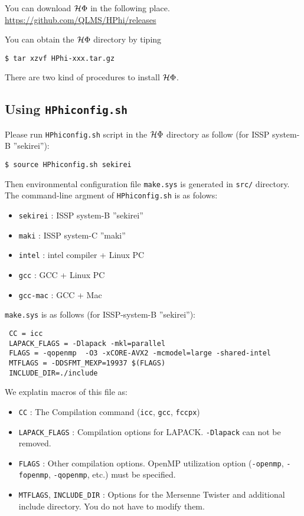 You can download $\mathcal{H} \Phi$ in the following place.\\
\url{https://github.com/QLMS/HPhi/releases}

You can obtain the $\mathcal{H} \Phi$ directory by tiping
\begin{verbatim}
$ tar xzvf HPhi-xxx.tar.gz
\end{verbatim}

There are two kind of procedures to install $\mathcal{H} \Phi$.

\subsection{Using \texttt{HPhiconfig.sh}}

Please run \verb|HPhiconfig.sh| script in the $\mathcal{H} \Phi$ directory as follow
(for ISSP system-B ''sekirei''):
\begin{verbatim}
$ source HPhiconfig.sh sekirei
\end{verbatim}
Then environmental configuration file \verb|make.sys| is generated in 
\verb|src/| directory.
The command-line argment of \verb|HPhiconfig.sh| is as folows:
\begin{itemize}
\item \verb|sekirei| : ISSP system-B ''sekirei''
\item \verb|maki| : ISSP system-C ''maki''
\item \verb|intel| : intel compiler + Linux PC
\item \verb|gcc| : GCC + Linux PC
\item \verb|gcc-mac| : GCC + Mac
\end{itemize}

\verb|make.sys| is as follows (for ISSP-system-B ''sekirei''):
\begin{verbatim}
 CC = icc
 LAPACK_FLAGS = -Dlapack -mkl=parallel 
 FLAGS = -qopenmp  -O3 -xCORE-AVX2 -mcmodel=large -shared-intel
 MTFLAGS = -DDSFMT_MEXP=19937 $(FLAGS)
 INCLUDE_DIR=./include
\end{verbatim}
We explatin macros of this file as: 
\begin{itemize}
\item \verb|CC| : The Compilation command (\verb|icc|, \verb|gcc|, \verb|fccpx|)
\item \verb|LAPACK_FLAGS| : Compilation options for LAPACK. \verb|-Dlapack| can not be removed.
\item \verb|FLAGS| : Other compilation options.
  OpenMP utilization option (\verb|-openmp|, \verb|-fopenmp|, \verb|-qopenmp|, etc.)
  must be specified.
\item \verb|MTFLAGS|, \verb|INCLUDE_DIR| : Options for the Mersenne Twister
  and additional include directory. You do not have to modify them.
\end{itemize}


